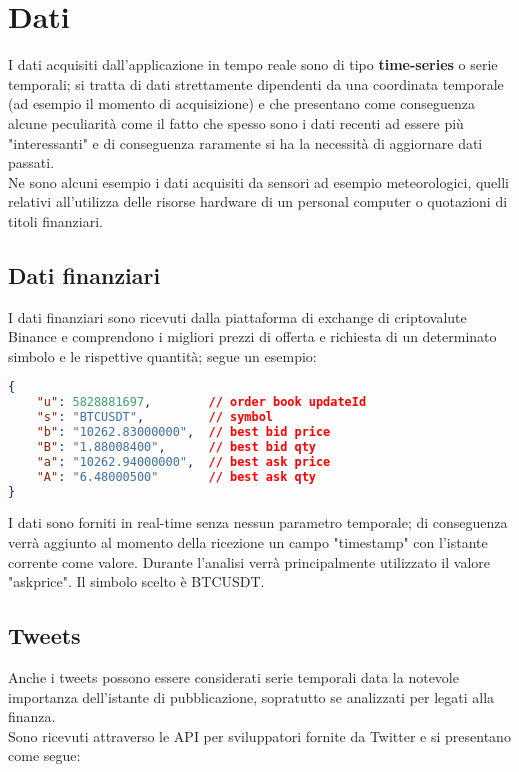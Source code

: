 \section{Dati}

I dati acquisiti dall'applicazione in tempo reale sono di tipo \textbf{time-series} o serie
temporali; si tratta di dati strettamente dipendenti da una coordinata temporale (ad esempio
il momento di acquisizione) e che presentano come conseguenza alcune peculiarità come il fatto
che spesso sono i dati recenti ad essere più "interessanti" e di conseguenza raramente si ha
la necessità di aggiornare dati passati.
\\
Ne sono alcuni esempio i dati acquisiti da sensori ad esempio meteorologici, quelli relativi
all'utilizza delle risorse hardware di un personal computer o quotazioni di titoli finanziari.

\subsection{Dati finanziari}

I dati finanziari sono ricevuti dalla piattaforma di exchange di criptovalute Binance \cite{binance}
e comprendono i migliori prezzi di offerta e richiesta di un determinato simbolo e le rispettive
quantità; segue un esempio:

\begin{lstlisting}[language=json,firstnumber=1]
{
    "u": 5828881697,        // order book updateId
    "s": "BTCUSDT",         // symbol
    "b": "10262.83000000",  // best bid price
    "B": "1.88008400",      // best bid qty
    "a": "10262.94000000",  // best ask price
    "A": "6.48000500"       // best ask qty
}
\end{lstlisting}
%
I dati sono forniti in real-time senza nessun parametro temporale; di conseguenza verrà
aggiunto al momento della ricezione un campo "timestamp" con l'istante corrente come valore.
Durante l'analisi verrà principalmente utilizzato il valore "askprice".
Il simbolo scelto è BTCUSDT.

\subsection{Tweets}

Anche i tweets possono essere considerati serie temporali data la notevole importanza
dell'istante di pubblicazione, sopratutto se analizzati per legati alla finanza.
\\
Sono ricevuti attraverso le API per sviluppatori fornite da Twitter \cite{twitter} e si
presentano come segue:

